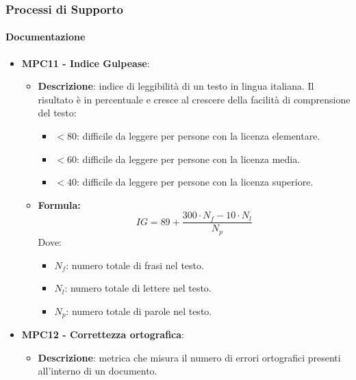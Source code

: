 \documentclass[10pt]{article}
\begin{document}
\begin{justify}
\begin{itemize}
\end{itemize}

\subsubsection{Processi di Supporto}
\paragraph{Documentazione}
\begin{itemize}
    \item \textbf{MPC11 - Indice Gulpease}:
    \begin{itemize}
        \item \textbf{Descrizione}: indice di leggibilità di un testo in lingua italiana. Il risultato è in percentuale e cresce al crescere della facilità di comprensione del testo:
            \begin{itemize}
                \item $< 80$: difficile da leggere per persone con la licenza elementare.
                \item $< 60$: difficile da leggere per persone con la licenza media.
                \item $< 40$: difficile da leggere per persone con la licenza superiore.
            \end{itemize}
        \item \textbf{Formula:}
        \[
        IG = 89 + \frac{300 \cdot N_f - 10 \cdot N_l}{N_p}
        \]
        Dove:
        \begin{itemize}
            \item $N_f$: numero totale di frasi nel testo.
            \item $N_l$: numero totale di lettere nel testo.
            \item $N_p$: numero totale di parole nel testo.
        \end{itemize}
    \end{itemize}

    \item \textbf{MPC12 - Correttezza ortografica}:
    \begin{itemize}
        \item \textbf{Descrizione}: metrica che misura il numero di errori ortografici presenti all'interno di un documento.
    \end{itemize}
\end{itemize}


\end{justify}
\end{document}
